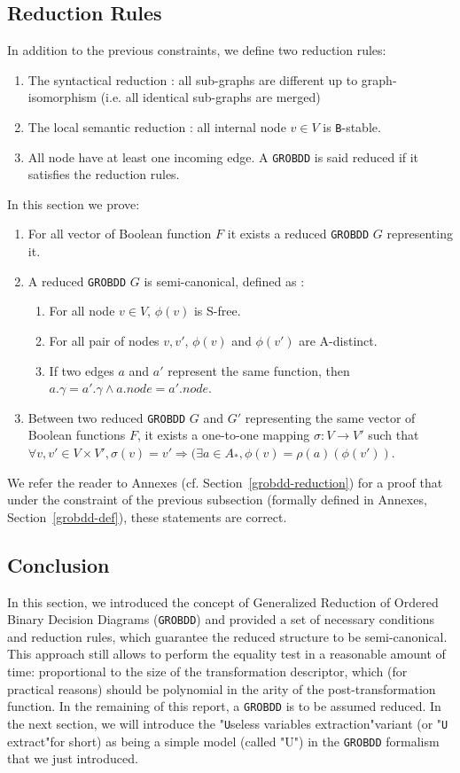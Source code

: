 \documentclass[a4paper,10pt]{article}
\newcommand{\Uextract}{"\texttt{U}seless variables extraction"}
\newcommand{\uextract}{"\texttt{U} extract"}
\newcommand{\GroBdd}{\texttt{GROBDD}}
\begin{document}
\subsection{Reduction Rules}
In addition to the previous constraints, we define two reduction rules:\begin{enumerate}
\item The syntactical reduction : all sub-graphs are different up to graph-isomorphism (i.e. all identical sub-graphs are merged)
\item The local semantic reduction : all internal node $v\in V$ is \texttt{B}-stable.
\item All node have at least one incoming edge.
A \GroBdd{} is said reduced if it satisfies the reduction rules.
\end{enumerate}
In this section we prove:\begin{enumerate}
\item For all vector of Boolean function $F$ it exists a reduced \GroBdd{} $G$ representing it.
\item A reduced \GroBdd{} $G$ is semi-canonical, defined as :\begin{enumerate}
\item For all node $v\in V$, $\phi(v)$ is S-free.
\item For all pair of nodes $v, v'$, $\phi(v)$ and $\phi(v')$ are A-distinct.
\item If two edges $a$ and $a'$ represent the same function, then $a.\gamma = a'.\gamma \land a.node = a'.node$.
\end{enumerate}
\item Between two reduced \GroBdd{} $G$ and $G'$ representing the same vector of Boolean functions $F$, it exists a one-to-one mapping $\sigma : V \longrightarrow V'$ such that $\forall v, v' \in V \times V', \sigma(v) = v' \Rightarrow (\exists a \in A_{*}, \phi(v) = \rho(a)(\phi(v'))$.
\end{enumerate}

We refer the reader to Annexes (cf. Section~\ref{grobdd-reduction}) for a proof that under the constraint of the previous subsection (formally defined in Annexes, Section~\ref{grobdd-def}), these statements are correct.

\subsection{Conclusion}

In this section, we introduced the concept of Generalized Reduction of Ordered Binary Decision Diagrams (\GroBdd{}) and provided a set of necessary conditions and reduction rules, which guarantee the reduced structure to be semi-canonical. This approach still allows to perform the equality test in a reasonable amount of time: proportional to the size of the transformation descriptor, which (for practical reasons) should be polynomial in the arity of the post-transformation function.
In the remaining of this report, a \GroBdd{} is to be assumed reduced.
In the next section, we will introduce the \Uextract variant (or \uextract for short) as being a simple model (called "U") in the \GroBdd{} formalism that we just introduced.
\end{document}
